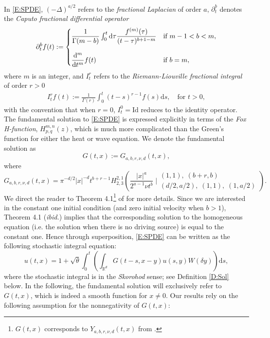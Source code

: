 \documentclass[12pt]{report}
\theoremstyle{plain}
\theoremstyle{definition}
\numberwithin{equation}{section}
\newcommand{\R}{\mathbb{R}}
\newcommand{\ud}{\ensuremath{ \mathrm{d} }}
\begin{document}
In \eqref{E:SPDE}, $(-\Delta)^{a/2}$ refers to the {\it fractional Laplacian} of order $a$,
$\partial^b_t$ denotes the {\it Caputo fractional differential operator}
\begin{align*}
\partial^b_tf(t) :=
\begin{cases}
\dfrac{1}{\Gamma(m-b)} \int_0^t \ud \tau \dfrac{f^{(m)}(\tau)}{(t-\tau)^{b+1-m}} & \text{if } m-1 < b < m, \bigskip \\
\dfrac{\ud^m}{\ud t^m}f(t)                                                       & \text{if } b=m,
\end{cases}
\end{align*}
where $m$ is an integer, and $I^r_t$ refers to the {\it Riemann-Liouville fractional integral} of
order $r>0$
\begin{align*}
I^r_tf(t) := \frac{1}{\Gamma(r)} \int_0^t (t-s)^{r-1}f(s)\ud s, \quad \text{for } t>0,
\end{align*}
with the convention that when $r=0$, $I^0_t = \text{Id}$ reduces to the identity operator. The
fundamental solution to \eqref{E:SPDE} is expressed explicitly in terms of the {\it Fox H-function},
$H^{m,n}_{p,q}(z)$, which is much more complicated than the Green's function for either the heat or
wave equation. We denote the fundamental solution as
\begin{equation} \label{E:GreenFunction}
G(t,x):= G_{a,b,r,\nu,d}(t,x),
\end{equation}
where
\[
G_{a,b,r,\nu,d}(t,x) = \pi^{-d/2} |x|^{-d} t^{b+r-1} H^{2,1}_{2,3}\left( \frac{|x|^a}{2^{a-1}\nu t^b}\;  \Bigg \vert  \begin{array}{l}
(1,1),\; (b+r,b) \\
(d/2,a/2),\; (1,1),\; (1,a/2)
\end{array} \right).
\]
We direct the reader to Theorem 4.1\footnote{$G(t,x)$ corresponds to $Y_{a,b,r,\nu,d}(t,x)$ from
	\cite{chen.hu.ea:19:nonlinear}.} of \cite{chen.hu.ea:19:nonlinear} for more details. Since we are interested in the constant one initial
condition (and zero initial velocity when $b>1$), Theorem 4.1 ({\it ibid.}) implies that the
corresponding solution to the homogeneous equation (i.e. the solution when there is no driving
source) is equal to the constant one. Hence through superposition, \eqref{E:SPDE} can be written as
the following stochastic integral equation:
\begin{equation} \label{E:spdeint}
u(t,x) = 1 + \sqrt{\theta}\int_0^t \left( \int_{\R^d}G(t-s,x-y)u(s,y) W(\delta y) \right) \ud s,
\end{equation}
where the stochastic integral is in the {\it Skorohod} sense; see Definition \ref{D:Sol} below.  In
the following, the fundamental solution will exclusively refer to $G(t,x)$, which is indeed a smooth
function for $x\ne 0$. Our results rely on the following assumption for the nonnegativity of
$G(t,x)$:
\end{document}
